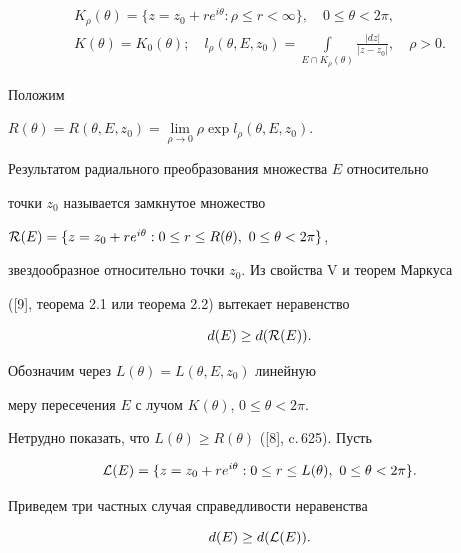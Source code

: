 \begin{gather*}


K_\rho (\theta )=\{ z=z_0+re^{i\theta}: \rho\leq r<\infty \},\quad


0\leq\theta<2\pi, \\


K(\theta )=K_0(\theta );\quad 


l_\rho(\theta, E, z_0)=


\int\limits_{E\cap K_\rho (\theta)}\frac{|dz|}{|z-z_0|},\quad \rho>0.


\end{gather*} 


Положим


$R(\theta )=R(\theta, E, z_0)=\lim\limits_{\rho\to  0}\rho\exp 


l_\rho(\theta,E,z_0)$.


Результатом радиального преобразования множества $E$ относительно


точки $z_0$ называется замкнутое множество 


${\cal R}(E)= \{ z=z_0+re^{i\theta}:0\leq r\leq R(\theta),\ 


0\leq\theta<2\pi\}$,


звездообразное относительно точки $z_0$. Из свойства V и теорем Маркуса


([9], теорема 2.1 или теорема 2.2) вытекает неравенство


\begin{equation}


d(E)\geq d({\cal R}(E)).


\end{equation}





Обозначим через $L(\theta )=L(\theta, E, z_0) $ линейную


меру пересечения $E$ с лучом $K(\theta)$, $0\leq\theta<2\pi$.


Нетрудно показать, что $L(\theta )\geq R(\theta)$ ([8], c.\,625). Пусть


$$


{\cal L}(E)= \{ z=z_0+re^{i\theta}:  0\leq r\leq L(\theta ) ,\ 


0\leq\theta<2\pi\}.


$$


Приведем три частных случая справедливости неравенства 


\begin{equation}


d(E)\geq d({\cal L}(E)).


\end{equation}





